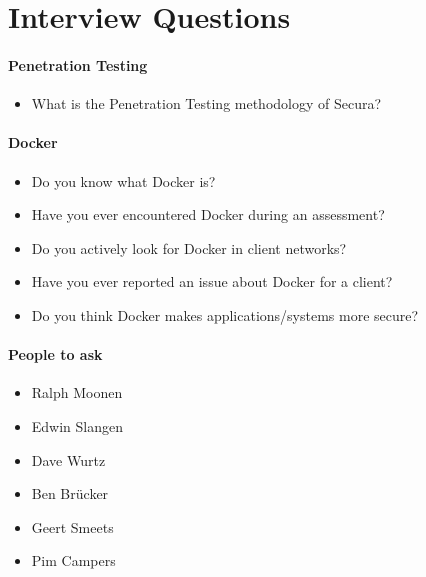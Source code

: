 \chapter{Interview Questions}\label{appendix:Interview-Questions}

\subsubsection{Penetration Testing}
\begin{itemize}
    \item What is the Penetration Testing methodology of Secura?
\end{itemize}

\subsubsection{Docker}
\begin{itemize}
    \item Do you know what Docker is?
    \item Have you ever encountered Docker during an assessment?
    \item Do you actively look for Docker in client networks?
    \item Have you ever reported an issue about Docker for a client?
    \item Do you think Docker makes applications/systems more secure?
\end{itemize}

\subsubsection{People to ask}
\begin{itemize}
    \item Ralph Moonen
    \item Edwin Slangen
    \item Dave Wurtz
    \item Ben Brücker
    \item Geert Smeets
    \item Pim Campers
\end{itemize}
